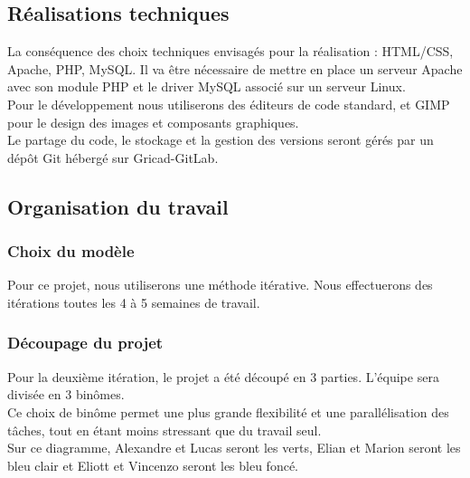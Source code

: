 \documentclass[a4paper,11pt]{article}
\begin{document}
\subsection{Réalisations techniques}

La conséquence des choix techniques envisagés pour la réalisation : HTML/CSS, Apache, PHP, MySQL.
Il va être nécessaire de mettre en place un serveur Apache avec son module PHP et le driver MySQL
associé sur un serveur Linux.\\

Pour le développement nous utiliserons des éditeurs de code standard, et GIMP pour le design des
images et composants graphiques.\\

Le partage du code, le stockage et la gestion des versions seront gérés par un dépôt Git hébergé sur
Gricad-GitLab.\\

\subsection{Organisation du travail}

\subsubsection{Choix du modèle}

Pour ce projet, nous utiliserons une méthode itérative. Nous effectuerons des itérations toutes les 4
à 5 semaines de travail.\\

\subsubsection{Découpage du projet}

Pour la deuxième itération, le projet a été découpé en 3 parties. L’équipe sera divisée en 3 binômes.\\

Ce choix de binôme permet une plus grande flexibilité et une parallélisation des tâches, tout en étant
moins stressant que du travail seul.\\

Sur ce diagramme, Alexandre et Lucas seront les verts,
Elian et Marion seront les bleu clair et
Eliott et Vincenzo seront les bleu foncé.\\
\end{document}
